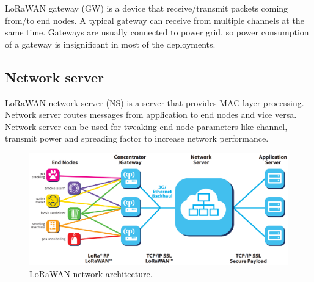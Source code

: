 LoRaWAN gateway (GW) is a device that receive/transmit packets coming from/to end nodes. A typical gateway can receive from multiple channels at the same time. Gateways are usually connected to power grid, so power consumption of a gateway is insignificant in most of the deployments.


\subsection{Network server}

LoRaWAN network server (NS) is a server that provides MAC layer processing. Network server routes messages from application to end nodes and vice versa. Network server can be used for tweaking end node parameters like channel, transmit power and spreading factor to increase network performance.

\begin{figure}
\centering
\includegraphics[width=\linewidth]{fig/lorawan_network.png}
\vspace*{4mm}
\caption{LoRaWAN network architecture. \cite{lorawan.technical.overview}}
\label{fig:lorawan_network}
\end{figure}
